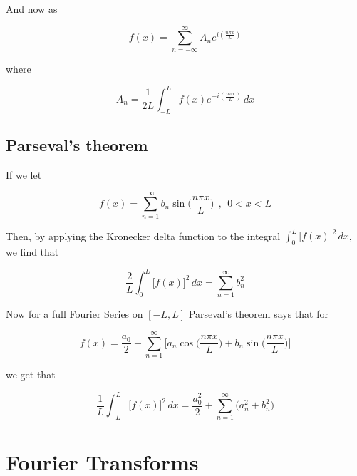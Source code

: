 \documentclass[a4paper]{article}
\begin{document}
And now as

\begin{equation*}
    f(x)=\sum_{n=-\infty}^{\infty} A_n e^{i(\frac{n\pi x}{L})}
\end{equation*}

where

\begin{equation*}
    A_n=\frac{1}{2L}\int_{-L}^{L} f(x)e^{-i(\frac{n\pi x}{L})}\,dx
\end{equation*}

\subsection{Parseval's theorem}

If we let

\begin{equation*}
    f(x)=\sum_{n=1}^{\infty}b_n\sin\bigg(\frac{n\pi x}{L}\bigg) \ \ , \ \ 0 < x < L
\end{equation*}

Then, by applying the Kronecker delta function to the integral $\int_{0}^{L}\big[f(x)\big]^2\,dx$, we find that

\begin{equation*}
    \frac{2}{L}\int_{0}^{L}\big[f(x)\big]^2\,dx=\sum_{n=1}^{\infty}b_n^2
\end{equation*}


Now for a full Fourier Series on $[-L, L]$ Parseval's theorem says that for

\begin{equation*}
    f(x)=\frac{a_0}{2}+\sum_{n=1}^{\infty}\bigg[a_n\cos\bigg(\frac{n\pi x}{L}\bigg)+b_n\sin\bigg(\frac{n\pi x}{L}\bigg)\bigg]
\end{equation*}

we get that

\begin{equation*}
    \frac{1}{L}\int_{-L}^{L}\big[f(x)\big]^2\,dx=\frac{a_0^2}{2}+\sum_{n=1}^{\infty}\big(a_n^2+b_n^2\big)
\end{equation*}

\section{Fourier Transforms}
\end{document}
